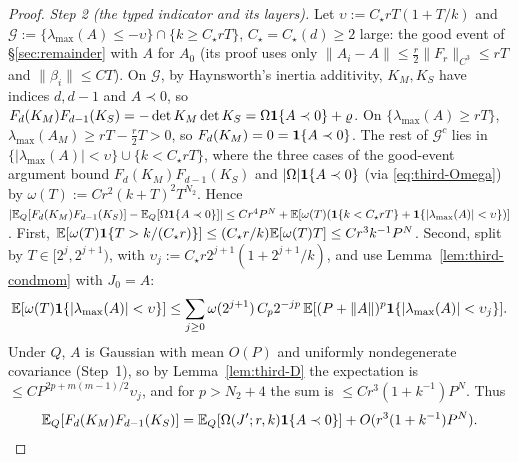 \begin{proof}
\emph{Step 2 (the typed indicator and its layers).} Let $\upsilon:=C_\star rT(1+T/k)$ and $\mathcal G:=\{\lambda_{\max}(A)\le-\upsilon\}\cap\{k\ge C_\star rT\}$, $C_\star=C_\star(d)\ge2$ large: the good event of \S\ref{sec:remainder} with $A$ for $A_0$ (its proof uses only $\|A_i-A\|\le\frac r2\|F_r\|_{C^3}\le rT$ and $\|\beta_i\|\le CT$). On $\mathcal G$, by Haynsworth's inertia additivity, $K_M,K_S$ have indices $d,d-1$ and $A\prec0$, so $F_d(K_M)F_{d-1}(K_S)=-\det K_M\det K_S=\Omega\mathbf 1\{A\prec0\}+\varrho$. On $\{\lambda_{\max}(A)\ge rT\}$, $\lambda_{\max}(A_M)\ge rT-\frac r2T>0$, so $F_d(K_M)=0=\mathbf 1\{A\prec0\}$. The rest of $\mathcal G^c$ lies in $\{|\lambda_{\max}(A)|<\upsilon\}\cup\{k<C_\star rT\}$, where the three cases of the good-event argument bound $F_d(K_M)F_{d-1}(K_S)$ and $|\Omega|\mathbf 1\{A\prec0\}$ (via \eqref{eq:third-Omega}) by $\omega(T):=Cr^2(k+T)^2T^{N_2}$. Hence $|\mathbb E_Q[F_d(K_M)F_{d-1}(K_S)]-\mathbb E_Q[\Omega\mathbf 1\{A\prec0\}]|\le Cr^4P^N+\mathbb E[\omega(T)(\mathbf 1\{k<C_\star rT\}+\mathbf 1\{|\lambda_{\max}(A)|<\upsilon\})]$. First, $\mathbb E[\omega(T)\mathbf 1\{T>k/(C_\star r)\}]\le(C_\star r/k)\mathbb E[\omega(T)T]\le Cr^3k^{-1}P^N$. Second, split by $T\in[2^j,2^{j+1})$, with $\upsilon_j:=C_\star r2^{j+1}(1+2^{j+1}/k)$, and use Lemma~\ref{lem:third-condmom} with $J_0=A$:
\[
\mathbb E[\omega(T)\mathbf 1\{|\lambda_{\max}(A)|<\upsilon\}]\le\sum_{j\ge0}\omega(2^{j+1})\,C_p2^{-jp}\,\mathbb E[(P+\|A\|)^p\mathbf 1\{|\lambda_{\max}(A)|<\upsilon_j\}].
\]
Under $Q$, $A$ is Gaussian with mean $O(P)$ and uniformly nondegenerate covariance (Step~1), so by Lemma~\ref{lem:third-D} the expectation is $\le CP^{2p+m(m-1)/2}\upsilon_j$, and for $p>N_2+4$ the sum is $\le Cr^3(1+k^{-1})P^N$. Thus
\begin{equation}\label{eq:third-F3}
\mathbb E_Q[F_d(K_M)F_{d-1}(K_S)]=\mathbb E_Q[\Omega(J';r,k)\mathbf 1\{A\prec0\}]+O(r^3(1+k^{-1})P^N).
\end{equation}


\end{proof}

